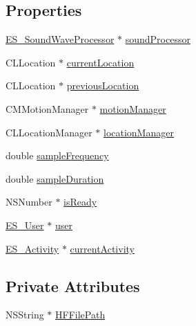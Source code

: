 \subsection*{Properties}
\begin{DoxyCompactItemize}
\item 
\hyperlink{interface_e_s___sound_wave_processor}{E\+S\+\_\+\+Sound\+Wave\+Processor} $\ast$ \hyperlink{interface_e_s___sensor_manager_a7cb9dfe9396c8b1b8d6124dd9fb1fce6}{sound\+Processor}
\item 
C\+L\+Location $\ast$ \hyperlink{interface_e_s___sensor_manager_a8f98f8169461263c9f7fe754d5ccc531}{current\+Location}
\item 
C\+L\+Location $\ast$ \hyperlink{interface_e_s___sensor_manager_a31827eb8eea66c5d077873a73b3b2ef7}{previous\+Location}
\item 
C\+M\+Motion\+Manager $\ast$ \hyperlink{interface_e_s___sensor_manager_a23ed2528ff350f481910e6f2a2fc8657}{motion\+Manager}
\item 
C\+L\+Location\+Manager $\ast$ \hyperlink{interface_e_s___sensor_manager_ae7f8aa8184fb028d3c50004d7f3fbe07}{location\+Manager}
\item 
double \hyperlink{interface_e_s___sensor_manager_a4de937849fa5d7a7ae694be0942e9265}{sample\+Frequency}
\item 
double \hyperlink{interface_e_s___sensor_manager_ac711421753d85dfb05e239d4292d34f6}{sample\+Duration}
\item 
N\+S\+Number $\ast$ \hyperlink{interface_e_s___sensor_manager_a87228331e9e81eb8b0aba211bafac0d5}{is\+Ready}
\item 
\hyperlink{interface_e_s___user}{E\+S\+\_\+\+User} $\ast$ \hyperlink{interface_e_s___sensor_manager_a487cebc582f9d0fb56c4a4650cf61f1d}{user}
\item 
\hyperlink{interface_e_s___activity}{E\+S\+\_\+\+Activity} $\ast$ \hyperlink{interface_e_s___sensor_manager_a142171a0db25411f1ec3b2d6699029d7}{current\+Activity}
\end{DoxyCompactItemize}
\subsection*{Private Attributes}
\begin{DoxyCompactItemize}
\item 
N\+S\+String $\ast$ \hyperlink{interface_e_s___sensor_manager_adf7e41ad94da107933da2bafcb4859e3}{H\+F\+File\+Path}
\end{DoxyCompactItemize}


